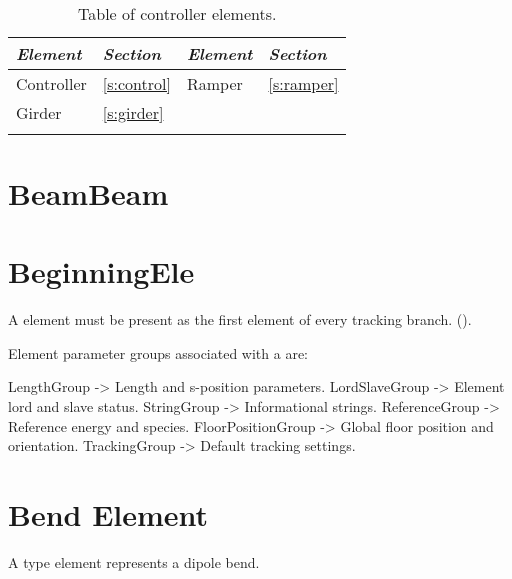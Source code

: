 \begin{table}[ht]
\centering
{\tt
\begin{tabular}{llll} \toprule
  {\it Element}  & {\it Section}     & {\it Element}  & {\it Section}    \\ \midrule
  Controller     & \ref{s:control}     &  Ramper        & \ref{s:ramper}   \\
  Girder         & \ref{s:girder}    &                &                  \\
 \\ \bottomrule
\end{tabular}
}
\caption{Table of controller elements.}
\label{t:control.classes}
\end{table}

\newpage

\section{BeamBeam}
\label{s:beambeam}


\section{BeginningEle}
\label{s:begin.ele}

A  element must be present as the first element of every tracking branch.
().

Element parameter groups associated with a  are:
\begin{example}
  LengthGroup          -> Length and s-position parameters.
  LordSlaveGroup       -> Element lord and slave status.
  StringGroup          -> Informational strings.
  ReferenceGroup       -> Reference energy and species.
  FloorPositionGroup   -> Global floor position and orientation.
  TrackingGroup        -> Default tracking settings.
\end{example}

\newpage

\section{Bend Element}
\label{s:bend}

A  type element represents a dipole bend. 

